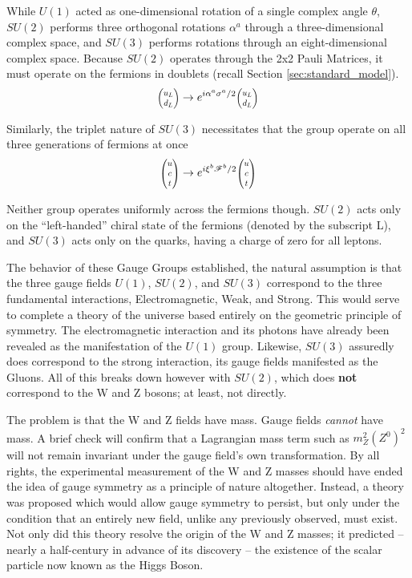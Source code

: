     While $U(1)$ acted as one-dimensional rotation of a single complex angle $\theta$,
        $SU(2)$ performs three orthogonal rotations $\alpha^a$ through a three-dimensional complex space,
        and $SU(3)$ performs rotations through an eight-dimensional complex space.
    Because $SU(2)$ operates through the 2x2 Pauli Matrices, it must operate on the fermions in doublets
        (recall Section \ref{sec:standard_model}).
    \begin{equation}
        \minimatrix{u_L \\ d_L} \to e^{i \alpha^a \sigma^a / 2} \minimatrix{u_L \\ d_L}
    \end{equation}

    Similarly, the triplet nature of $SU(3)$ necessitates that the group operate on all three generations of fermions at once
    \begin{equation}
        \minimatrix{u\\c\\t} \to e^{i \xi^b \mathscr{F}^b / 2} \minimatrix{u\\c\\t}
    \end{equation}

    Neither group operates uniformly across the fermions though.
    $SU(2)$ acts only on the ``left-handed'' chiral state of the fermions (denoted by the subscript L),
        and $SU(3)$ acts only on the quarks, having a charge of zero for all leptons.

    The behavior of these Gauge Groups established, the natural assumption is that the three gauge fields
        $U(1)$, $SU(2)$, and $SU(3)$ correspond to the three fundamental interactions,
        Electromagnetic, Weak, and Strong.
    This would serve to complete a theory of the universe based entirely on the geometric principle of symmetry.
    The electromagnetic interaction and its photons have already been revealed as the manifestation of the $U(1)$ group. 
    Likewise, $SU(3)$ assuredly does correspond to the strong interaction, its gauge fields manifested as the Gluons.
    All of this breaks down however with $SU(2)$, which does \textbf{not} correspond to the W and Z bosons;
        at least, not directly.

    The problem is that the W and Z fields have mass.
    Gauge fields \textit{cannot} have mass.
    A brief check will confirm that a Lagrangian mass term such as $m_Z^2 (Z^0)^2$
        will not remain invariant under the gauge field's own transformation.
    By all rights, the experimental measurement of the W and Z masses should have
        ended the idea of gauge symmetry as a principle of nature altogether.
    Instead, a theory was proposed which would allow gauge symmetry to persist,
        but only under the condition that an entirely new field, unlike any previously observed, must exist.
    Not only did this theory resolve the origin of the W and Z masses;
        it predicted -- nearly a half-century in advance of its discovery --
        the existence of the scalar particle now known as the Higgs Boson.
    \cite{Osborn_notes}
    \cite{Peskin_book}
    \cite{Halzen_book}

